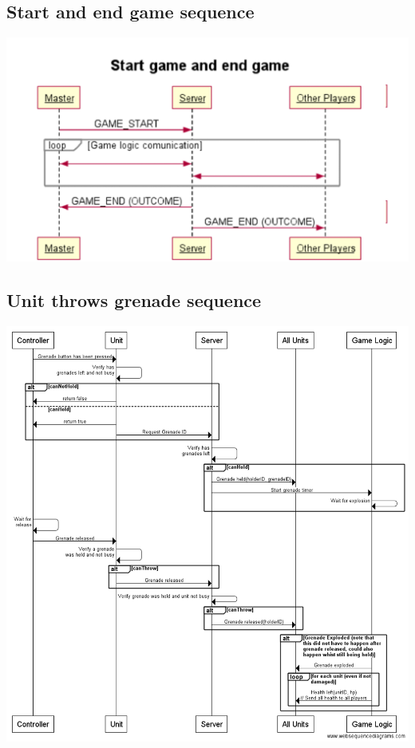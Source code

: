 \documentclass[12pt]{article}
\begin{document}
\subsection*{Start and end game sequence}
\includegraphics[scale=0.5]{start-end-sequence}
\subsection*{Unit throws grenade sequence}
\includegraphics[scale=0.5]{grenade-sequence}
\newpage
\end{document}
